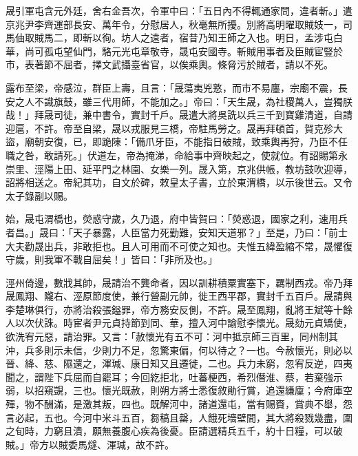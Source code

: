 \begin{pinyinscope}
 晟引軍屯含元外廷，舍右金吾次，令軍中曰：「五日內不得輒通家問，違者斬。」遣京兆尹李齊運部長安、萬年令，分慰居人，秋毫無所擾。別將高明曜取賊妓一，司馬伷取賊馬二，即斬以徇。坊人之遠者，宿昔乃知王師之入也。明日，孟涉屯白華，尚可孤屯望仙門，駱元光屯章敬寺，晟屯安國寺。斬賊用事者及臣賊宦豎於市，表著節不屈者，擇文武攝臺省官，以俟乘輿。條脅污於賊者，請以不死。



 露布至梁，帝感泣，群臣上壽，且言：「晟蕩夷兇憝，而市不易廛，宗廟不震，長安之人不識旗鼓，雖三代用師，不能加之。」帝曰：「天生晟，為社稷萬人，豈獨朕哉！」拜晟司徒，兼中書令，實封千戶。晟遣大將吳詵以兵三千到寶雞清道，自請迎扈，不許。帝至自梁，晟以戎服見三橋，帝駐馬勞之。晟再拜頓首，賀克殄大盜，廟朝安復，已，即跪陳：「備爪牙臣，不能指日破賊，致乘輿再狩，乃臣不任職之咎，敢請死。」伏道左，帝為掩涕，命給事中齊映起之，使就位。有詔賜第永崇里、涇陽上田、延平門之林園、女樂一列。晟入第，京兆供帳，教坊鼓吹迎導，詔將相送之。帝紀其功，自文於碑，敕皇太子書，立於東渭橋，以示後世云。又令太子錄副以賜。



 始，晟屯渭橋也，熒惑守歲，久乃退，府中皆賀曰：「熒惑退，國家之利，速用兵者昌。」晟曰：「天子暴露，人臣當力死勤難，安知天道邪？」至是，乃曰：「前士大夫勸晟出兵，非敢拒也。且人可用而不可使之知也。夫惟五緯盈縮不常，晟懼復守歲，則我軍不戰自屈矣！」皆曰：「非所及也。」



 涇州倚邊，數戕其帥，晟請治不龔命者，因以訓耕積粟實塞下，羈制西戎。帝乃拜晟鳳翔、隴右、涇原節度使，兼行營副元帥，徙王西平郡，實封千五百戶。晟請與李楚琳俱行，亦將治殺張鎰罪，帝方務安反側，不許。晟至鳳翔，亂將王斌等十餘人以次伏誅。時宦者尹元貞持節到同、華，擅入河中諭慰李懷光。晟劾元貞矯使，欲洗宥元惡，請治罪。又言：「赦懷光有五不可：河中抵京師三百里，同州制其沖，兵多則示未信，少則力不足，忽驚東偏，何以待之？一也。今赦懷光，則必以晉、絳、慈、隰還之，渾瑊、康日知又且遷徙，二也。兵力未窮，忽宥反逆，四夷聞之，謂陛下兵屈而自罷耳；今回紇拒北，吐蕃梗西，希烈僭淮、蔡，若棄強示弱，以招窺覬，三也。懷光既赦，則朔方將士悉復敘勛行賞，追還縑廩；今府庫空殫，物不酬滿，是激其叛，四也。既解河中，諸道還屯，當有賜賚，賞典不舉，怨言必起，五也。今河中米斗五百，芻稿且罄，人餓死墻壁間，其大將殺戮幾盡，圍之旬時，力窮且潰，願無養腹心疾為後憂。臣請選精兵五千，約十日糧，可以破賊。」帝方以賊委馬燧、渾瑊，故不許。




\end{pinyinscope}
